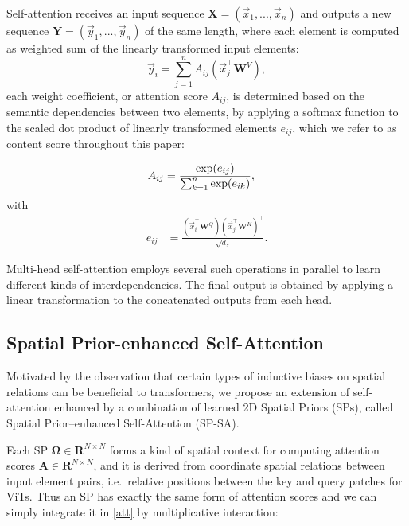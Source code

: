 \documentclass[authorversion, sigconf, acmthm=false, nonacm=true]{acmart}
\begin{document}
Self-attention receives an input sequence $\mathbf{X}=(\vec{x}_1,...,\vec{x}_n)$ and outputs a new sequence $\mathbf{Y}=(\vec{y}_1,...,\vec{y}_n)$ of the same length, where each element is computed as weighted sum of the linearly transformed input elements:
\begin{equation}
\vec{y}_i = \sum_{j=1}^n A_{ij}(\vec{x}_j^{\top}\mathbf{W}^V)
,
\end{equation}
each weight coefficient, or attention score $A_{ij}$, is determined based on the semantic dependencies between two elements, by applying a softmax function to
the scaled dot product of linearly transformed elements $e_{ij}$, which we refer to as content score throughout this paper:

\begin{align}\label{att} 
 A_{ij} &=\frac{{\rm exp} (e_{ij})} {\sum^n_{k=1} {\rm exp} (e_{ik})},
\end{align}
 with
 \begin{align}
e_{ij} &= \frac{(\vec{x}_i^\top\mathbf{W}^Q) (\vec{x}_j^\top\mathbf{W}^K)^\top}{\sqrt{d_z}}.
\end{align}

Multi-head self-attention employs several such operations in parallel to learn different kinds of interdependencies. 
The final output is obtained by applying a linear transformation to the concatenated outputs from each head.










\subsection{Spatial Prior-enhanced Self-Attention}


Motivated by the observation that certain types of inductive biases on spatial relations can be beneficial to transformers,
we propose an extension of self-attention enhanced by a combination of learned 2D Spatial Priors (SPs), called Spatial Prior–enhanced Self-Attention (SP-SA).

Each SP $\mathbf{\Omega} \in \mathbf{R}^{N \times N}$ forms a kind of spatial context for computing attention scores $\mathbf{A}\in \mathbf{R}^{N \times N}$, 
and it is derived from coordinate spatial relations between input element pairs,
i.e.~relative positions between the key and query patches for ViTs.
Thus an SP has exactly the same form of attention scores and we can simply integrate it in \cref{att} by multiplicative interaction:
\end{document}
